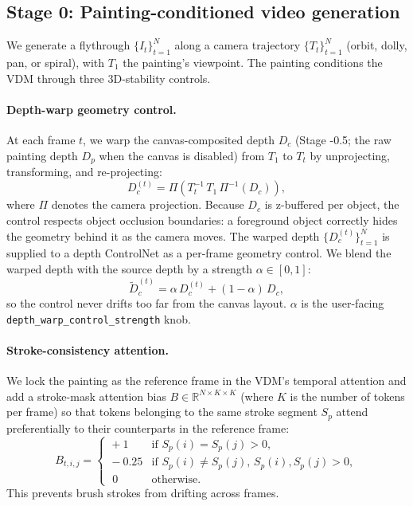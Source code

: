 \documentclass[10pt,twocolumn,letterpaper]{article}
\begin{document}
\subsection{Stage 0: Painting-conditioned video generation}
\label{sec:stage0}

We generate a flythrough $\{I_t\}_{t=1}^{N}$ along a camera trajectory
$\{T_t\}_{t=1}^{N}$ (orbit, dolly, pan, or spiral), with $T_1$ the painting's
viewpoint. The painting conditions the VDM through three 3D-stability
controls.

\paragraph{Depth-warp geometry control.}
At each frame $t$, we warp the canvas-composited depth $D_c$ (Stage -0.5;
the raw painting depth $D_p$ when the canvas is disabled) from $T_1$ to
$T_t$ by unprojecting, transforming, and re-projecting:
\begin{equation}
D_c^{(t)} = \Pi\!\left(T_t^{-1}\, T_1\, \Pi^{-1}(D_c)\right),
\end{equation}
where $\Pi$ denotes the camera projection. Because $D_c$ is z-buffered per
object, the control respects object occlusion boundaries: a foreground
object correctly hides the geometry behind it as the camera moves. The
warped depth $\{D_c^{(t)}\}_{t=1}^{N}$ is supplied to a depth ControlNet as
a per-frame geometry control. We blend the warped depth with the source
depth by a strength $\alpha \in [0,1]$:
\begin{equation}
\tilde{D}_c^{(t)} = \alpha\, D_c^{(t)} + (1-\alpha)\, D_c,
\end{equation}
so the control never drifts too far from the canvas layout. $\alpha$ is
the user-facing \texttt{depth\_warp\_control\_strength} knob.

\paragraph{Stroke-consistency attention.}
We lock the painting as the reference frame in the VDM's temporal attention
and add a stroke-mask attention bias $B \in \mathbb{R}^{N\times K\times K}$
(where $K$ is the number of tokens per frame) so that tokens belonging to the
same stroke segment $S_p$ attend preferentially to their counterparts in the
reference frame:
\begin{equation}
B_{t,i,j} = \!\begin{cases}
\!+1 & \text{if } S_p(i)\!=\!S_p(j)\!>\!0, \\
\!-0.25 & \text{if } S_p(i)\!\neq\!S_p(j),\, S_p(i),S_p(j)\!>\!0, \\
\;0 & \text{otherwise.}
\end{cases}
\end{equation}
This prevents brush strokes from drifting across frames.
\end{document}
